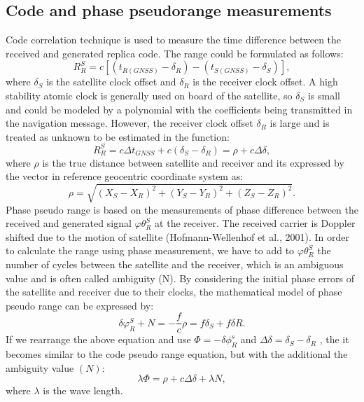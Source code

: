 \subsection{Code and phase pseudorange measurements}
Code correlation technique is used to measure the time difference between the received and
generated replica code. The range could be formulated as follows:
\begin{equation}
	\label{equ:range}
	R_{R}^{S} = c [(t_{R(GNSS)}-\delta_{R})-( t_{S(GNSS)}-\delta_{S})],
\end{equation}
where $\delta_{S}$ is the satellite clock offset  and $\delta_{R}$ is the receiver clock offset.
A high stability atomic clock is generally used on board of the satellite, so $\delta_{S}$ is 
small and could be modeled by a polynomial with the coefficients being transmitted in the 
navigation message. However, the receiver clock offset $\delta_{R}$ is large and is treated as
 unknown to be estimated in the function:
\begin{equation}
	\label{equ:reciever_error}
	R_{R}^{S} = c \Delta t_{GNSS} + c( \delta_{S} - \delta_{R}) = \rho + c  \Delta \delta,
\end{equation}
where $\rho$ is the true distance between satellite and receiver and its expressed by the vector in
reference geocentric coordinate system as:
\begin{equation}
	\label{equ:distance_geocentric}
	\rho = \sqrt{(X_{S}-X_{R})^{2}+(Y_{S}-Y_{R})^{2}+(Z_{S}-Z_{R})^{2}}.
\end{equation}
Phase pseudo range is based on the measurements of phase difference between the received and
generated signal $\varphi \theta_{R}^{S}$ at the receiver. The received carrier is
Doppler shifted due to the motion of satellite (Hofmann-Wellenhof et al., 2001).
In order to calculate the range using phase measurement, we have to add to $\varphi \theta_{R}^{S}$ 
the number of cycles between the satellite and the receiver, which is an ambiguous value and is
often called ambiguity (N). By considering the initial phase errors of the satellite and receiver
due to their clocks, the mathematical model of phase pseudo range can be expressed by:
\begin{equation}
	\label{equ:phase_pseudorange}
\delta \varphi_{R}^{S}+N = -\frac{f}{c}\rho = f\delta_{S} + f\delta{R}.
\end{equation}
If we rearrange the above equation and use $\Phi = -\delta \phi_{R}^{s}$ and 
$\Delta \delta = \delta_{S} - \delta_{R}$ , the it becomes similar to the code pseudo range
equation, but with the additional the ambiguity value $(N)$:
\begin{equation}
	\label{equ:phase_pseudorange2}
	\lambda \Phi = \rho + c \Delta \delta + \lambda  N,
\end{equation}
where $\lambda$ is the wave length.
